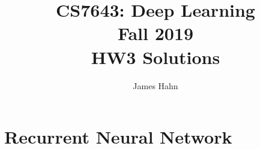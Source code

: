 \documentclass[11pt,english]{article}
\begin{document}
\title{CS7643: Deep Learning \\
Fall 2019\\ HW3 Solutions}
\author{James Hahn}
\maketitle

\setcounter{MaxMatrixCols}{25}
\setlength\arraycolsep{1pt}


\section{Recurrent Neural Network}
\end{document}
